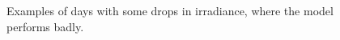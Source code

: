 \begin{figure}[ht!]
    \qquad
    \caption{Examples of days with some drops in irradiance, where the model performs badly.
    \label{fig:full_med_bad}}
\end{figure}

\clearpage
